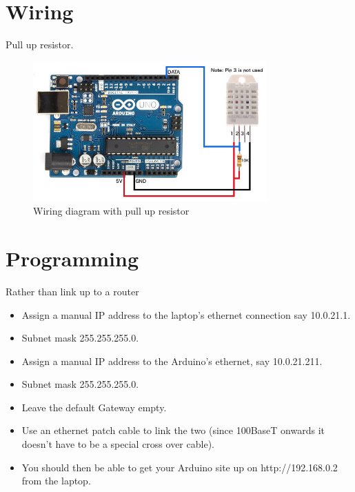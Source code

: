 \documentclass[a4paper, 12pt]{article}
\begin{document}
\section{Wiring}

Pull up resistor.



\begin{figure}[H]
  \centering
  \includegraphics[width=0.8\textwidth]{wiring-dht22.jpg}
  \caption{Wiring diagram with pull up resistor}
\end{figure}



\section{Programming}

Rather than link up to a router

\begin{itemize}
  \item Assign a manual IP address to the laptop's ethernet connection say 10.0.21.1.
  \item Subnet mask 255.255.255.0.
  \item Assign a manual IP address to the Arduino's ethernet, say 10.0.21.211.
  \item Subnet mask 255.255.255.0.
  \item Leave the default Gateway empty.
  \item Use an ethernet patch cable to link the two (since 100BaseT onwards it doesn't have to be a special cross over cable).
  \item You should then be able to get your Arduino site up on http://192.168.0.2 from the laptop.
\end{itemize}
\end{document}
